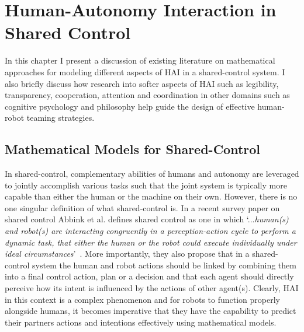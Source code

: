 \documentclass[12pt]{article}
\newcommand{\DGc}[1]{{\textbf{\color{blue}{#1}}}}
\begin{document}
\pagebreak

\section{Human-Autonomy Interaction in Shared Control}
\label{sec:HRI_SA}

In this chapter I present a discussion of existing literature on mathematical approaches for modeling different aspects of HAI in a shared-control system.  
I also briefly discuss how research into softer aspects of HAI such as legibility, transparency, cooperation, attention and coordination in other domains such as cognitive psychology and philosophy help guide the design of effective human-robot teaming strategies. 


\subsection{Mathematical Models for Shared-Control}
In shared-control, complementary abilities of humans and autonomy are leveraged to jointly accomplish various tasks such that the joint system is typically more capable than either the human or the machine on their own. However, there is no one singular definition of what shared-control is. In a recent survey paper on shared control Abbink et al. defines shared control as one in which `...\textit{human(s) and robot(s) are interacting congruently in a perception-action cycle to perform a dynamic task, that either the human or the robot could execute individually under ideal circumstances}'~\cite{abbink2018topology}. More importantly, they also propose that in a shared-control system the human and robot actions should be linked by combining them into a final control action, plan or a decision and that each agent should directly perceive how its intent is influenced by the actions of other agent(s). Clearly, HAI in this context is a complex phenomenon and for robots to function properly alongside humans, it becomes imperative that they have the capability to predict their partners actions and intentions effectively using mathematical models. 
\end{document}
